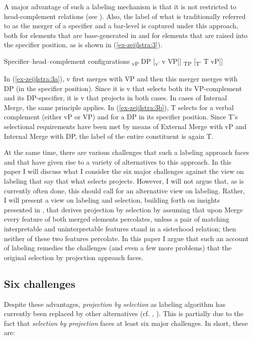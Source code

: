 \documentclass[output=paper
,modfonts
,nonflat]{langsci/langscibook}
\begin{document}
A major advantage of such a labeling mechanism is that it is not restricted to head-complement relations (see \citealt{Adger2003}). Also, the label of what is traditionally referred to as the merger of a specifier and a bar-level is captured under this approach, both for elements that are base-generated in and for elements that are raised into the specifier position, as is shown in (\ref{ex-zeijlstra:3}).

\begin{exe}
	\ex Specifier–head–complement configurations \label{ex-zeijlstra:3}
	\xlist
	\ex {[}\textsubscript{vP} DP {[}\textsubscript{v'} v VP{]}{]} \label{ex-zeijlstra:3a}
	\ex {[}\textsubscript{TP} {[}\textsubscript{T'} T vP{]}{]} \label{ex-zeijlstra:3b}
	\endxlist
\end{exe}
In (\ref{ex-zeijlstra:3a}), v first merges with VP and then this merger merges with DP (in the specifier position). Since it is v that selects both its VP-complement and its DP-specifier, it is v that projects in both cases. In cases of Internal Merge, the same principle applies. In (\ref{ex-zeijlstra:3b}), T selects for a verbal complement (either vP or VP) and for a DP in its specifier position. Since T’s selectional requirements have been met by means of External Merge with vP and Internal Merge with DP, the label of the entire constituent is again T.

At the same time, there are various challenges that such a labeling approach faces and that have given rise to a variety of alternatives to this approach. In this paper I will discuss what I consider the six major challenges against the view on labeling that say that what selects projects. However, I will not argue that, as is currently often done, this should call for an alternative view on labeling. Rather, I will present a view on labeling and selection, building forth on insights presented in \citet{Adger2003}, that derives projection by selection by assuming that upon Merge every feature of both merged elements percolates, unless a pair of matching interpretable and uninterpretable features stand in a sisterhood relation; then neither of these two features percolate. In this paper I argue that such an account of labeling remedies the challenges (and even a few more problems) that the original selection by projection approach faces.

\subsection{Six challenges} \label{sec-zeijlstra:1.2}
Despite these advantages, \textit{projection by selection} as labeling algorithm has currently been replaced by other alternatives (cf. \citealt{Collins2002}, \citealt{Chomsky2008, Chomsky2013, Chomsky2015}). This is partially due to the fact that \textit{selection by projection} faces at least six major challenges. In short, these are: 
\end{document}
